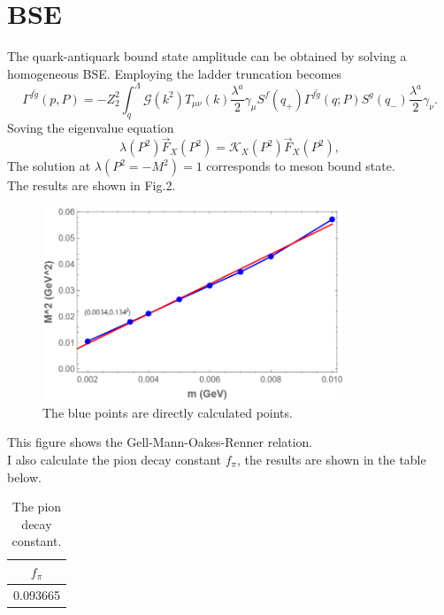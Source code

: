 \documentclass{article}
\begin{document}
\section{BSE}
The quark-antiquark bound state amplitude can be obtained by solving a homogeneous BSE. Employing the ladder truncation becomes
\begin{equation}
    \Gamma^{f\widetilde{g}}\left(p,P\right)=-Z_2^2\int_{q}^{\Lambda}\mathcal{G}\left(k^2\right)T_{\mu\nu}\left(k\right)\frac{\lambda^a}{2}\gamma_{\mu}S^f\left(q_+\right)\Gamma^{f\widetilde{g}}\left(q;P\right)S^g\left(q_-\right)\frac{\lambda^a}{2}\gamma_{\nu}.
\end{equation}
Soving the eigenvalue equation
\begin{equation}
    \lambda\left(P^2\right)\overrightarrow{F}_X\left(P^2\right)=\mathcal{K}_X\left(P^2\right)\overrightarrow{F}_X\left(P^2\right),
\end{equation}
The solution at $\lambda\left(P^2=-M^2\right)=1$ corresponds to meson bound state.\\
The results are shown in Fig.2.
\begin{figure}[H]
    \centering
    \includegraphics[width=0.8\textwidth]{pm-M^2.png}
    \caption{The blue points are directly calculated points.}
\end{figure}
This figure shows the Gell-Mann-Oakes-Renner relation.\\
I also calculate the pion decay constant $f_{\pi}$, the results are shown in the table below.
\begin{table}[H]
    \centering
    \begin{tabular}{|c|}
    \hline
    $f_{\pi}$ \\
    \hline
    0.093665 \\
    \hline
    \end{tabular}
    \caption{The pion decay constant.}
\end{table}
\end{document}
